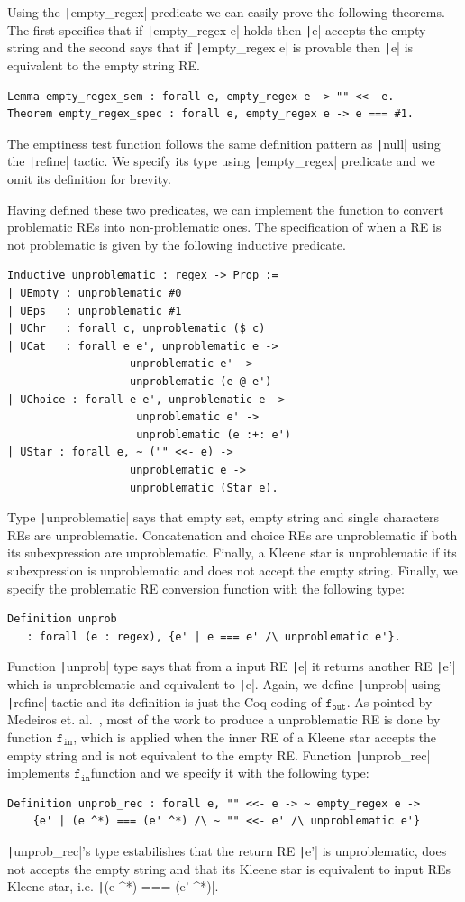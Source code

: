 \documentclass[review]{elsarticle}
\newcommand{\fin}{\ensuremath{\texttt{f$_{\texttt{in}}$}}}
\newcommand{\fout}{\ensuremath{\texttt{f$_{\texttt{out}}$}}}
\newcommand{\coq}[1]{\texttt|#1|}
\theoremstyle{definition}
\begin{document}
Using the \coq{empty_regex} predicate we can easily prove the following
theorems. The first specifies that if \coq{empty_regex e} holds then
\coq{e} accepts the empty string and the second says that if
\coq{empty_regex e} is provable then \coq{e} is equivalent to the empty
string RE.

\begin{verbatim}
Lemma empty_regex_sem : forall e, empty_regex e -> "" <<- e.
Theorem empty_regex_spec : forall e, empty_regex e -> e === #1.
\end{verbatim}

The emptiness test function follows the same definition pattern as \coq{null}
using the \coq{refine} tactic. We specify its type using \coq{empty_regex}
predicate and we omit its definition for brevity.

Having defined these two predicates, we can implement the function to
convert problematic REs into non-problematic ones. The specification
of when a RE is not problematic is given by the following inductive predicate. 
\begin{verbatim}
Inductive unproblematic : regex -> Prop :=
| UEmpty : unproblematic #0
| UEps   : unproblematic #1
| UChr   : forall c, unproblematic ($ c)
| UCat   : forall e e', unproblematic e ->
                   unproblematic e' ->
                   unproblematic (e @ e')
| UChoice : forall e e', unproblematic e ->
                    unproblematic e' ->
                    unproblematic (e :+: e')
| UStar : forall e, ~ ("" <<- e) -> 
                   unproblematic e -> 
                   unproblematic (Star e).
\end{verbatim}
Type \coq{unproblematic} says that empty set, empty string and single
characters REs are unproblematic. Concatenation and choice REs are
unproblematic if both its subexpression are unproblematic. Finally,
a Kleene star is unproblematic if its subexpression is unproblematic and
does not accept the empty string. Finally, we specify the problematic RE
conversion function with the following type:
\begin{verbatim}
Definition unprob 
   : forall (e : regex), {e' | e === e' /\ unproblematic e'}.
\end{verbatim}
Function \coq{unprob} type says that from a input RE \coq{e} it returns another
RE \coq{e'} which is unproblematic and equivalent to \coq{e}. Again, we define
\coq{unprob} using \coq{refine} tactic and its definition is just the
Coq coding of \fout. As pointed by Medeiros et. al.~\cite{Medeiros14}, most of
the work to produce a unproblematic RE is done by function \fin, which is
applied when the inner RE of a Kleene star accepts the empty string and is not
equivalent to the empty RE. Function \coq{unprob_rec} implements \fin function
and we specify it with the following type:
\begin{verbatim}
Definition unprob_rec : forall e, "" <<- e -> ~ empty_regex e -> 
    {e' | (e ^*) === (e' ^*) /\ ~ "" <<- e' /\ unproblematic e'}
\end{verbatim}
\coq{unprob_rec}'s type estabilishes that the return RE \coq{e'} is unproblematic, does not
accepts the empty string and that its Kleene star is equivalent to input REs
Kleene star, i.e.  \coq{(e ^*) === (e' ^*)}.
\end{document}
